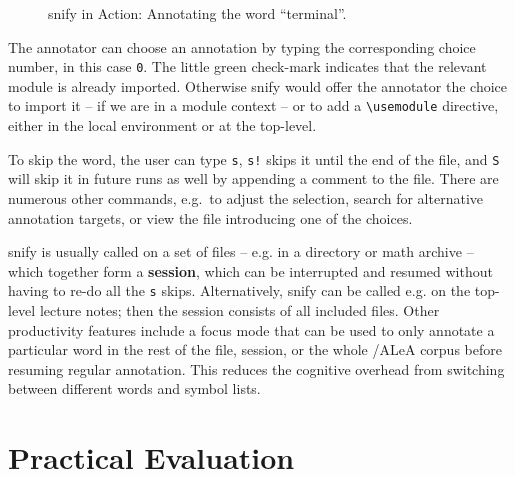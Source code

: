 \documentclass{llncs}
\newcommand\ALeA{\textsf{ALeA}\xspace}
\newcommand\snify{\textsf{snify}\xspace}
\begin{document}
\begin{figure}[ht]
  \setlength{\fboxsep}{0pt}
  \caption{\snify in Action: Annotating the word ``terminal''.}\label{fig:snify}
\end{figure}

The annotator can choose an annotation by typing the corresponding choice number,
in this case \lstinline|0|.
The little green check-mark indicates that the relevant module is already imported.
Otherwise \snify would offer the annotator the choice to import it -- if we are
in a module context -- or to add a \lstinline|\usemodule| directive, either in the
local environment or at the top-level.

To skip the word, the user can type \lstinline|s|,
\lstinline|s!| skips it until the end of the file, and \lstinline|S|
will skip it in future runs as well by appending a comment to the file.
There are numerous other commands, e.g.\ to adjust the selection,
search for alternative annotation targets,
or view the file introducing one of the choices.

\snify is usually called on a set of files -- e.g. in a directory or math archive -- which
together form a \textbf{session}, which can be interrupted and resumed without having to
re-do all the \lstinline|s| skips. Alternatively, \snify can be called e.g. on the top-level
lecture notes; then the session consists of all included files. Other productivity
features include a focus mode that can be used to only annotate a particular word in the
rest of the file, session, or the whole \sTeX/\ALeA corpus before resuming regular
annotation. This reduces the cognitive overhead from switching between different 
words and symbol lists.

\section{Practical Evaluation}
\end{document}
